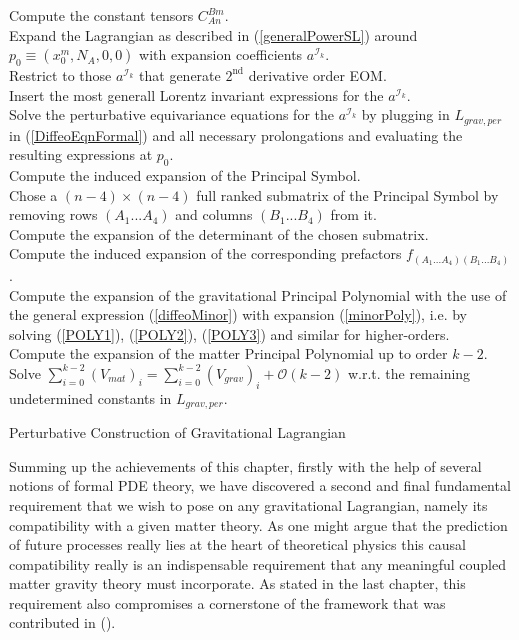 \documentclass[a4paper,12pt, DIV=14, BCOR=5mm, twoside, headsepline, numbers=noenddot]{scrbook}
\begin{document}
\begin{algorithm}[hbt!]
\SetAlgoLined
{}
Compute the constant tensors $C^{Bm}_{An}$. \\
Expand the Lagrangian as described in (\ref{generalPowerSL}) around $p_0 \equiv (x_0^m,N_A,0,0)$ with expansion coefficients $a^{\mathcal{I}_k}$.\\
Restrict to those $a^{\mathcal{I}_k}$ that generate $2^{\text{nd}}$ derivative order EOM. \\
Insert the most generall Lorentz invariant expressions for the $a^{\mathcal{I}_k}$.\\
Solve the perturbative equivariance equations for the $a^{\mathcal{I}_k}$ by plugging in $L_{grav,per}$ in (\ref{DiffeoEqnFormal}) and all necessary prolongations and evaluating the resulting expressions at $p_0$.\\
Compute the induced expansion of the Principal Symbol.\\
Chose a $(n-4) \times (n-4)$ full ranked submatrix of the Principal Symbol by removing rows $(A_1...A_4)$ and columns $(B_1...B_4)$ from it. \\
Compute the expansion of the determinant of the chosen submatrix.\\
Compute the induced expansion of the corresponding prefactors $f_{(A_1...A_4)(B_1...B_4)}$. \\
Compute the expansion of the gravitational Principal Polynomial with the use of the general expression (\ref{diffeoMinor}) with expansion (\ref{minorPoly}), i.e. by solving (\ref{POLY1}), (\ref{POLY2}), (\ref{POLY3}) and similar for higher-orders. \\
Compute the expansion of the matter Principal Polynomial up to order $k-2$.\\
Solve $\sum_{i=0}^{k-2} (V_{mat})_i = \sum _{i=0}^{k-2}(V_{grav})_i + \mathcal{O}(k-2)$ w.r.t. the remaining undetermined constants in $L_{grav,per}$.
 \caption{Perturbative Construction of Gravitational Lagrangian}\label{Algo2}
\end{algorithm}

Summing up the achievements of this chapter, firstly with the help of several notions of formal PDE theory, we have discovered a second and final fundamental requirement that we wish to pose on any gravitational Lagrangian, namely its compatibility with a given matter theory. As one might argue that the prediction of future processes really lies at the heart of theoretical physics this causal compatibility really is an indispensable requirement that any meaningful coupled matter gravity theory must incorporate. As stated in the last chapter, this requirement also compromises a cornerstone of the framework that was contributed in (\cite{2018PhRvD..97h4036D}). 
\end{document}
